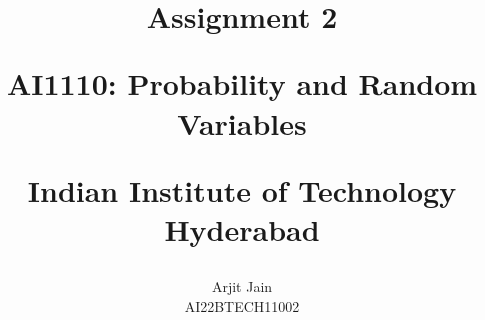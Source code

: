 \documentclass[journal,12pt,onecolumn]{IEEEtran}
\begin{document}
\let\vec\mathbf




\vspace{3cm}

\title{Assignment 2 

         \Large {AI1110: Probability and Random Variables
         
                Indian Institute of Technology Hyderabad}} 
                
\author{Arjit Jain 

          \normalsize {AI22BTECH11002} }


%
%
%

% 
%
\end{document}
